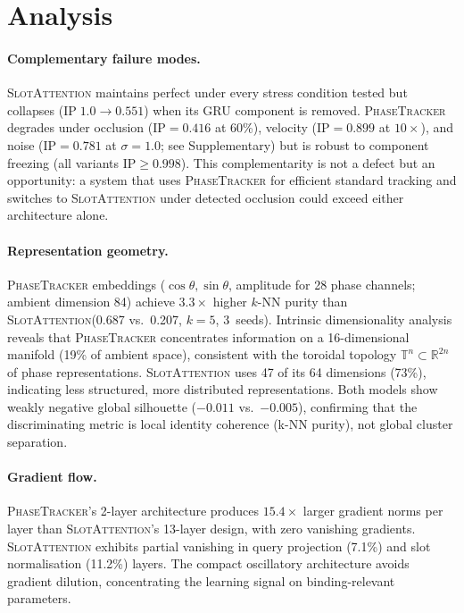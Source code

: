 \documentclass[11pt]{article}
\providecommand{\pt}{\textnormal{\textsc{PhaseTracker}}\xspace}
\providecommand{\sa}{\textnormal{\textsc{SlotAttention}}\xspace}
\providecommand{\ip}{\text{IP}}
\providecommand{\R}{\mathbb{R}}
\begin{document}


\section{Analysis}
\label{sec:analysis}

\paragraph{Complementary failure modes.}
\label{sec:complementary}
\sa maintains perfect \ip under every stress condition
tested but collapses ($\ip\;1.0 \to 0.551$) when its GRU component
is removed.  \pt degrades under occlusion
($\ip = 0.416$ at 60\%), velocity ($\ip = 0.899$ at $10\times$), and
noise ($\ip = 0.781$ at $\sigma = 1.0$; see Supplementary)
but is robust to component freezing (all variants
$\ip \geq 0.998$).  This complementarity is not a defect but an
opportunity: a system that uses \pt for efficient standard tracking
and switches to \sa under detected occlusion could exceed either
architecture alone.

\paragraph{Representation geometry.}
\pt embeddings ($\cos\theta, \sin\theta$, amplitude for 28 phase
channels; ambient dimension 84) achieve $3.3\times$ higher $k$-NN
purity than \sa (0.687 vs.\ 0.207, $k{=}5$, 3~seeds).  Intrinsic
dimensionality analysis reveals that \pt concentrates information on a
16-dimensional manifold (19\% of ambient space), consistent with the
toroidal topology $\mathbb{T}^n \subset \R^{2n}$ of phase
representations.  \sa uses 47 of its 64 dimensions (73\%), indicating
less structured, more distributed representations.  Both models show
weakly negative global silhouette ($-0.011$ vs.\ $-0.005$),
confirming that the discriminating metric is local identity coherence
(k-NN purity), not global cluster separation.

\paragraph{Gradient flow.}
\pt's 2-layer architecture produces $15.4\times$ larger gradient
norms per layer than \sa's 13-layer design, with zero vanishing
gradients.  \sa exhibits partial vanishing in query projection
(7.1\%) and slot normalisation (11.2\%) layers.  The compact
oscillatory architecture avoids gradient dilution, concentrating the
learning signal on binding-relevant parameters.
\end{document}
